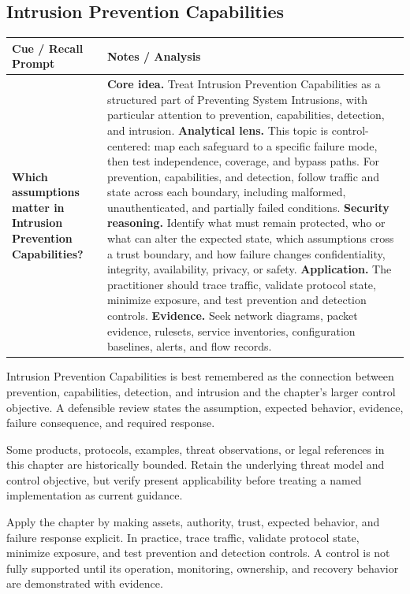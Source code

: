 \documentclass[11pt]{article}
\newcommand{\CornellHeader}{%
\rowcolor{Navy}\color{white}\bfseries Cue / Recall Prompt & \color{white}\bfseries Notes / Analysis\\\hline}
\newcommand{\CornellRow}[2]{%
\cellcolor{CueGray}\RaggedRight\textbf{#1} & \RaggedRight #2\\\hline}
\begin{document}
\subsection*{Intrusion Prevention Capabilities}
\begin{longtable}{>{\RaggedRight\arraybackslash}p{}|>{\RaggedRight\arraybackslash}p{}}
\CornellHeader
\CornellRow{Which assumptions matter in Intrusion Prevention Capabilities?}{\textbf{Core idea.} Treat Intrusion Prevention Capabilities as a structured part of Preventing System Intrusions, with particular attention to prevention, capabilities, detection, and intrusion. \textbf{Analytical lens.} This topic is control-centered: map each safeguard to a specific failure mode, then test independence, coverage, and bypass paths. For prevention, capabilities, and detection, follow traffic and state across each boundary, including malformed, unauthenticated, and partially failed conditions. \textbf{Security reasoning.} Identify what must remain protected, who or what can alter the expected state, which assumptions cross a trust boundary, and how failure changes confidentiality, integrity, availability, privacy, or safety. \textbf{Application.} The practitioner should trace traffic, validate protocol state, minimize exposure, and test prevention and detection controls. \textbf{Evidence.} Seek network diagrams, packet evidence, rulesets, service inventories, configuration baselines, alerts, and flow records.}
\end{longtable}
\begin{topicsummary}
Intrusion Prevention Capabilities is best remembered as the connection between prevention, capabilities, detection, and intrusion and the chapter's larger control objective. A defensible review states the assumption, expected behavior, evidence, failure consequence, and required response.
\end{topicsummary}
\begin{historybox}
Some products, protocols, examples, threat observations, or legal references in this chapter are historically bounded. Retain the underlying threat model and control objective, but verify present applicability before treating a named implementation as current guidance.
\end{historybox}
\begin{defensebox}
Apply the chapter by making assets, authority, trust, expected behavior, and failure response explicit. In practice, trace traffic, validate protocol state, minimize exposure, and test prevention and detection controls. A control is not fully supported until its operation, monitoring, ownership, and recovery behavior are demonstrated with evidence.
\end{defensebox}
\end{document}

